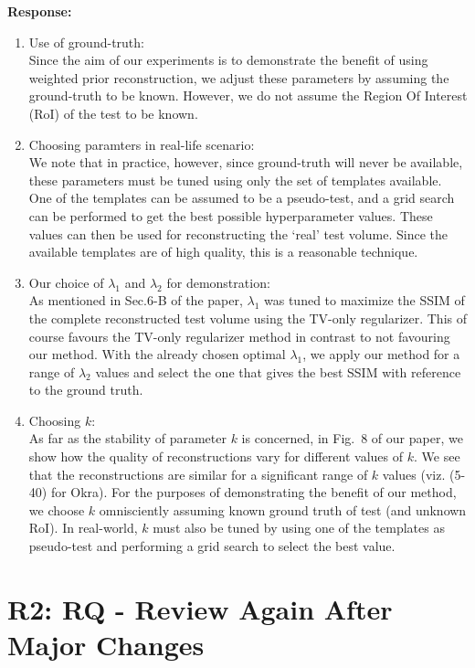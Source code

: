 \documentclass[11pt]{article}
\begin{document}
\textbf{Response:}
\begin{enumerate}
  
\item Use of ground-truth:\\ Since the aim of our experiments is to demonstrate the benefit of using weighted prior reconstruction, we adjust these parameters by assuming the ground-truth to be known. However, we do not assume the Region Of Interest (RoI) of the test to be known.

\item Choosing paramters in real-life scenario: \\We note that in
  practice, however, since ground-truth will never be available, these
  parameters must be tuned using only the set of templates available.
  One of the templates can be assumed to be a pseudo-test, and a grid
  search can be performed to get the best possible hyperparameter
  values. These values can then be used for reconstructing the `real'
  test volume.  Since the available templates are of high quality,
  this is a reasonable technique.

\item Our choice of $\lambda_1$ and $\lambda_2$ for demonstration:
  \\As mentioned in Sec.6-B of the paper, $\lambda_1$ was tuned to
  maximize the SSIM of the complete reconstructed test volume using
  the TV-only regularizer. This of course favours the TV-only
  regularizer method in contrast to not favouring our method.  With
  the already chosen optimal $\lambda_1$, we apply our method for a
  range of $\lambda_2$ values and select the one that gives the best
  SSIM with reference to the ground truth.

\item Choosing $k$:\\ As far as the stability of parameter $k$ is
  concerned, in Fig.\ 8 of our paper, we show how the quality of
  reconstructions vary for different values of $k$. We see that the
  reconstructions are similar for a significant range of $k$
  values (viz. (5-40) for Okra). For the purposes of demonstrating the
  benefit of our method, we choose $k$ omnisciently assuming known
  ground truth of test (and unknown RoI). In real-world, $k$ must also
  be tuned by using one of the templates as pseudo-test and performing
  a grid search to select the best value.

  \end{enumerate}

\section{R2: RQ - Review Again After Major Changes}
\end{document}
